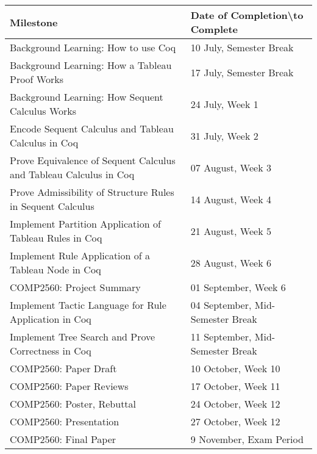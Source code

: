 \documentclass[onecolumn]{report}
\let\oldbibliography%
\renewcommand{}[1]{{%
  \let\chapter\section%
  \oldbibliography{#1}}}%
\begin{document}
\begin{table}[h]
\centering
\begin{tabular}{|p{}|p{}|}
\hline
Milestone & Date of Completion\textbackslash to Complete \\
\hline \hline
Background Learning: How to use Coq& 10 July, Semester Break \\
\hline
Background Learning: How a Tableau Proof Works& 17 July, Semester Break \\
\hline
Background Learning: How Sequent Calculus Works& 24 July, Week 1 \\
\hline
Encode Sequent Calculus and Tableau Calculus in Coq& 31 July, Week 2 \\
\hline
Prove Equivalence of Sequent Calculus and Tableau Calculus in Coq& 07 August, Week 3 \\
\hline
Prove Admissibility of Structure Rules in Sequent Calculus& 14 August, Week 4 \\
\hline
Implement Partition Application of Tableau Rules in Coq& 21 August, Week 5 \\
\hline
Implement Rule Application of a Tableau Node in Coq& 28 August, Week 6 \\
\hline
COMP2560: Project Summary& 01 September, Week 6 \\
\hline
Implement Tactic Language for Rule Application in Coq& 04 September, Mid-Semester Break \\
\hline
Implement Tree Search and Prove Correctness in Coq& 11 September, Mid-Semester Break \\
\hline
COMP2560: Paper Draft& 10 October, Week 10 \\
\hline
COMP2560: Paper Reviews& 17 October, Week 11 \\
\hline
COMP2560: Poster, Rebuttal& 24 October, Week 12 \\
\hline
COMP2560: Presentation& 27 October, Week 12 \\
\hline
COMP2560: Final Paper& 9 November, Exam Period\\
\hline
\end{tabular}
\end{table}



\end{document}

